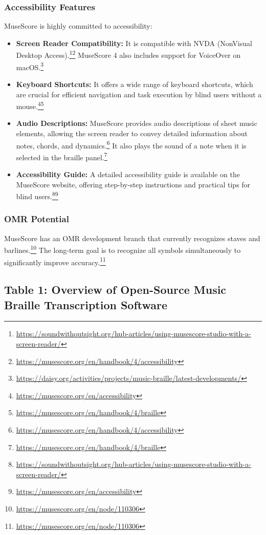 \subsubsection{Accessibility Features}
MuseScore is highly committed to accessibility:
\begin{itemize}[noitemsep,topsep=0pt]
    \item \textbf{Screen Reader Compatibility:} It is compatible with NVDA (NonVisual Desktop Access).\footnote{\url{https://soundwithoutsight.org/hub-articles/using-musescore-studio-with-a-screen-reader/}}\footnote{\url{https://musescore.org/en/handbook/4/accessibility}} MuseScore 4 also includes support for VoiceOver on macOS.\footnote{\url{https://daisy.org/activities/projects/music-braille/latest-developments/}}
    \item \textbf{Keyboard Shortcuts:} It offers a wide range of keyboard shortcuts, which are crucial for efficient navigation and task execution by blind users without a mouse.\footnote{\url{https://musescore.org/en/accessibility}}\footnote{\url{https://musescore.org/en/handbook/4/braille}}
    \item \textbf{Audio Descriptions:} MuseScore provides audio descriptions of sheet music elements, allowing the screen reader to convey detailed information about notes, chords, and dynamics.\footnote{\url{https://musescore.org/en/handbook/4/accessibility}} It also plays the sound of a note when it is selected in the braille panel.\footnote{\url{https://musescore.org/en/handbook/4/braille}}
    \item \textbf{Accessibility Guide:} A detailed accessibility guide is available on the MuseScore website, offering step-by-step instructions and practical tips for blind users.\footnote{\url{https://soundwithoutsight.org/hub-articles/using-musescore-studio-with-a-screen-reader/}}\footnote{\url{https://musescore.org/en/accessibility}}
\end{itemize}

\subsubsection{OMR Potential}
MuseScore has an OMR development branch that currently recognizes staves and barlines.\footnote{\url{https://musescore.org/en/node/110306}} The long-term goal is to recognize all symbols simultaneously to significantly improve accuracy.\footnote{\url{https://musescore.org/en/node/110306}}

\subsection{Table 1: Overview of Open-Source Music Braille Transcription Software}

